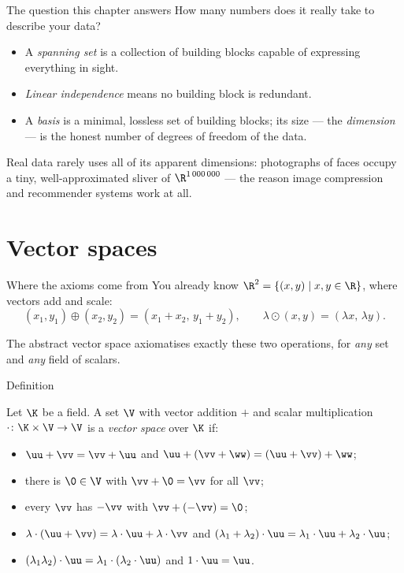\begin{frame}{The question this chapter answers}
How many numbers does it really take to describe your data?

\begin{itemize}
\item A \emph{spanning set} is a collection of building blocks capable of expressing everything in sight.
\pause
\item \emph{Linear independence} means no building block is redundant.
\pause
\item A \emph{basis} is a minimal, lossless set of building blocks; its size — the \emph{dimension} — is
the honest number of degrees of freedom of the data.
\end{itemize}

\pause

\begin{remark}
Real data rarely uses all of its apparent dimensions: photographs of faces occupy a tiny, well-approximated
sliver of $\R^{1\,000\,000}$ — the reason image compression and recommender systems work at all.
\end{remark}
\end{frame}

\section{Vector spaces}

\begin{frame}{Where the axioms come from}
You already know $\R^2 = \{(x,y)\mid x,y\in\R\}$, where vectors add and scale:
\[
(x_1,y_1)\oplus(x_2,y_2) = (x_1+x_2,\, y_1+y_2), \qquad \lambda\odot(x,y) = (\lambda x,\, \lambda y).
\]

\pause

The abstract vector space axiomatises exactly these two operations, for \emph{any} set and \emph{any} field
of scalars.
\end{frame}

\begin{frame}{Definition}
\begin{definition}
Let $\K$ be a field. A set $\V$ with vector addition $+$ and scalar multiplication $\cdot\colon\K\times\V\to\V$
is a \emph{vector space} over $\K$ if:
\begin{itemize}
\item $\uu+\vv=\vv+\uu$ and $\uu+(\vv+\ww)=(\uu+\vv)+\ww$;
\item there is $\0\in\V$ with $\vv+\0=\vv$ for all $\vv$;
\item every $\vv$ has $-\vv$ with $\vv+(-\vv)=\0$;
\item $\lambda\cdot(\uu+\vv)=\lambda\cdot\uu+\lambda\cdot\vv$ and $(\lambda_1+\lambda_2)\cdot\uu=\lambda_1\cdot\uu+\lambda_2\cdot\uu$;
\item $(\lambda_1\lambda_2)\cdot\uu=\lambda_1\cdot(\lambda_2\cdot\uu)$ and $1\cdot\uu=\uu$.
\end{itemize}
\end{definition}
\end{frame}

